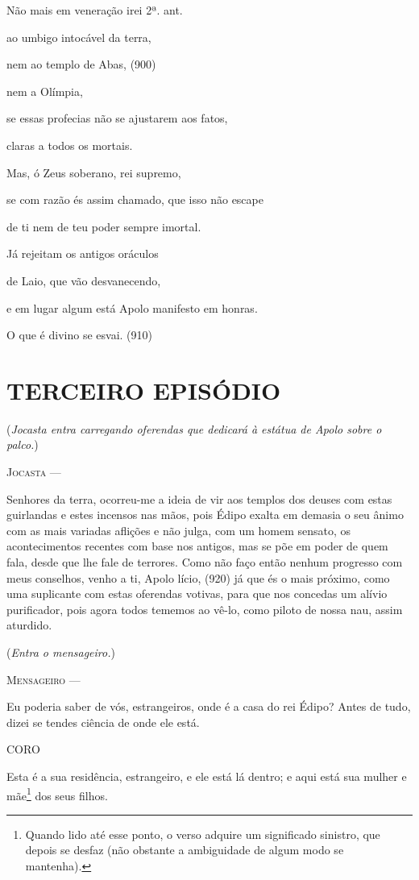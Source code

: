 Não mais em veneração irei 2ª. ant.

ao umbigo intocável da terra,

nem ao templo de Abas, (900)

nem a Olímpia,

se essas profecias não se ajustarem aos fatos,

claras a todos os mortais.

Mas, ó Zeus soberano, rei supremo,

se com razão és assim chamado, que isso não escape

de ti nem de teu poder sempre imortal.

Já rejeitam os antigos oráculos

de Laio, que vão desvanecendo,

e em lugar algum está Apolo manifesto em honras.

O que é divino se esvai. (910)

\section{TERCEIRO EPISÓDIO}

(\emph{Jocasta entra carregando oferendas que dedicará à estátua de
Apolo sobre o palco.})

\textsc{Jocasta} ---

Senhores da terra, ocorreu-me a ideia de vir aos templos dos deuses com
estas guirlandas e estes incensos nas mãos, pois Édipo exalta em demasia
o seu ânimo com as mais variadas aflições e não julga, com um homem
sensato, os acontecimentos recentes com base nos antigos, mas se põe em
poder de quem fala, desde que lhe fale de terrores. Como não faço então
nenhum progresso com meus conselhos, venho a ti, Apolo lício, (920) já
que és o mais próximo, como uma suplicante com estas oferendas votivas,
para que nos concedas um alívio purificador, pois agora todos tememos ao
vê-lo, como piloto de nossa nau, assim aturdido.

(\emph{Entra o mensageiro.})

\textsc{Mensageiro} ---

Eu poderia saber de vós, estrangeiros, onde é a casa do rei Édipo? Antes
de tudo, dizei se tendes ciência de onde ele está.

\textsc{CORO}

Esta é a sua residência, estrangeiro, e ele está lá dentro; e aqui está
sua mulher e mãe\footnote{Quando lido até esse ponto, o verso adquire um
  significado sinistro, que depois se desfaz (não obstante a ambiguidade
  de algum modo se mantenha).} dos seus filhos.

